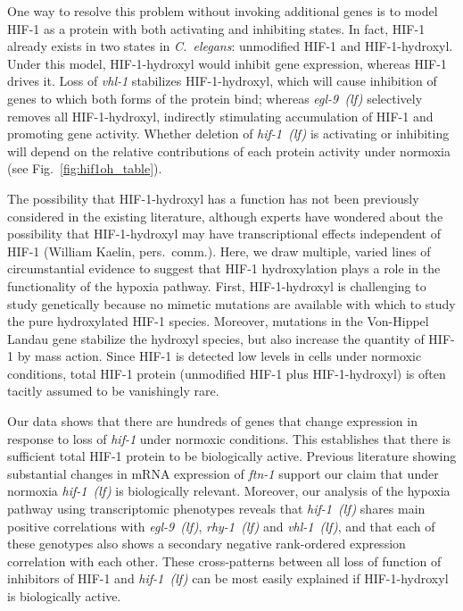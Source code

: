 \documentclass[9pt,twocolumn,twoside]{pnas-new}
\newcommand{\cel}{\emph{C.~elegans}}
\newcommand{\gene}[1]{\emph{#1}}
\newcommand{\ftna}{\emph{ftn-1}}
\newcommand{\egl}{\emph{egl-9~(lf)}}
\newcommand{\rhy}{\emph{rhy-1~(lf)}}
\newcommand{\vhl}{\emph{vhl-1~(lf)}}
\newcommand{\hif}{\emph{hif-1~(lf)}}
\newcommand{\hifp}{HIF-1}
\begin{document}
One way to resolve this problem without invoking additional genes is to
model \hifp{} as a protein with both activating and inhibiting states. In fact,
\hifp{} already exists in two states in \cel{}: unmodified \hifp{} and
\hifp{}-hydroxyl. Under this model, \hifp{}-hydroxyl would inhibit gene expression,
whereas \hifp{} drives it. Loss of \gene{vhl-1} stabilizes \hifp{}-hydroxyl, which will
cause inhibition of genes to which both forms of the protein bind; whereas \egl{}
selectively removes all \hifp{}-hydroxyl, indirectly stimulating accumulation of
\hifp{} and promoting gene activity. Whether deletion of \hif{} is activating or
inhibiting will depend on the relative contributions of each protein activity
under normoxia (see Fig.~\ref{fig:hif1oh_table}).

The possibility that \hifp{}-hydroxyl has a function has not been previously
considered in the existing literature, although experts have wondered about
the possibility that \hifp{}-hydroxyl may have transcriptional effects independent
of \hifp{} (William Kaelin, pers.\ comm.). Here, we draw multiple, varied lines
of circumstantial evidence to suggest that \hifp{} hydroxylation plays a role
in the functionality of the hypoxia pathway. First, \hifp{}-hydroxyl is
challenging to study genetically because no mimetic mutations are available with
which to study the pure hydroxylated \hifp{} species. Moreover, mutations in
the Von-Hippel Landau gene stabilize the hydroxyl species, but also increase the
quantity of \hifp{} by mass action. Since \hifp{} is detected low levels in cells
under normoxic conditions, total \hifp{} protein (unmodified \hifp{} plus
\hifp{}-hydroxyl) is often tacitly assumed to be vanishingly rare.

Our data shows that there are hundreds of genes that change expression in response
to loss of \gene{hif-1} under normoxic conditions. This establishes that there is sufficient
total \hifp{} protein to be biologically active. Previous literature showing
substantial changes in mRNA expression of \ftna{} support our claim that under
normoxia \hif{} is biologically relevant. Moreover, our analysis of the
hypoxia pathway using transcriptomic phenotypes reveals that \hif{} shares main
positive correlations with \egl{}, \rhy{} and \vhl{}, and that each of these genotypes
also shows a secondary negative rank-ordered expression correlation with each other.
These cross-patterns between all loss of function of inhibitors of \hifp{} and
\hif{} can be most easily explained if \hifp{}-hydroxyl is biologically active.
\end{document}
